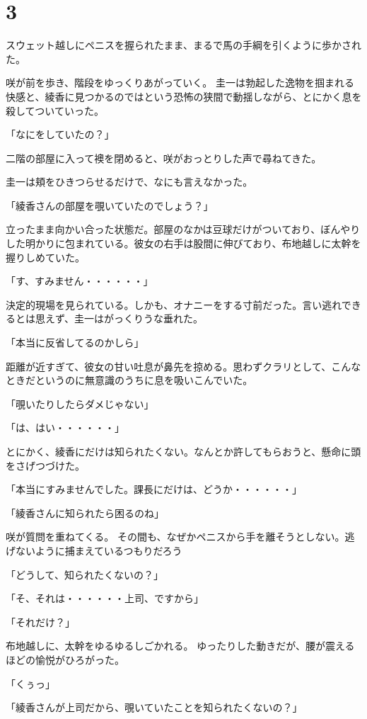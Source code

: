 ﻿\documentclass[book,tate]{jlreq}
\begin{document}
\section*{3}

スウェット越しにペニスを握られたまま、まるで馬の手綱を引くように歩かされた。

咲が前を歩き、階段をゆっくりあがっていく。 圭一は勃起した逸物を掴まれる快感と、綾香に見つかるのではという恐怖の狭間で動揺しながら、とにかく息を殺してついていった。

「なにをしていたの？」

二階の部屋に入って襖を閉めると、咲がおっとりした声で尋ねてきた。

圭一は頬をひきつらせるだけで、なにも言えなかった。

「綾香さんの部屋を覗いていたのでしょう？」

立ったまま向かい合った状態だ。部屋のなかは豆球だけがついており、ぼんやりした明かりに包まれている。彼女の右手は股間に伸びており、布地越しに太幹を握りしめていた。

「す、すみません・・・・・・」

決定的現場を見られている。しかも、オナニーをする寸前だった。言い逃れできるとは思えず、圭一はがっくりうな垂れた。

「本当に反省してるのかしら」

距離が近すぎて、彼女の甘い吐息が鼻先を掠める。思わずクラリとして、こんなときだというのに無意識のうちに息を吸いこんでいた。

「覗いたりしたらダメじゃない」

「は、はい・・・・・・」

とにかく、綾香にだけは知られたくない。なんとか許してもらおうと、懸命に頭をさげつづけた。

「本当にすみませんでした。課長にだけは、どうか・・・・・・」

「綾香さんに知られたら困るのね」

咲が質問を重ねてくる。 その間も、なぜかペニスから手を離そうとしない。逃げないように捕まえているつもりだろう

「どうして、知られたくないの？」

「そ、それは・・・・・・上司、ですから」

「それだけ？」

布地越しに、太幹をゆるゆるしごかれる。 ゆったりした動きだが、腰が震えるほどの愉悦がひろがった。

「くぅっ」

「綾香さんが上司だから、覗いていたことを知られたくないの？」
\end{document}
